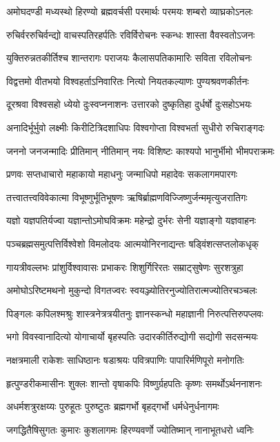 \twolineshloka
{अमोघदण्डी मध्यस्थो हिरण्यो ब्रह्मवर्चसी}
{परमार्थः परमयः शम्बरो व्याघ्रकोऽनलः}

\twolineshloka
{रुचिर्वररुचिर्वन्द्यो वाचस्पतिरहर्पतिः}
{रविर्विरोचनः स्कन्धः शास्ता वैवस्वतोऽजनः}

\twolineshloka
{युक्तिरुन्नतकीर्तिश्च शान्तरागः पराजयः}
{कैलासपतिकामारिः सविता रविलोचनः}

\twolineshloka
{विद्वत्तमो वीतभयो विश्वहर्ताऽनिवारितः}
{नित्यो नियतकल्याणः पुण्यश्रवणकीर्तनः}

\twolineshloka
{दूरश्रवा विश्वसहो ध्येयो दुःस्वप्ननाशनः}
{उत्तारको दुष्कृतिहा दुर्धर्षो दुःसहोऽभयः}

\twolineshloka
{अनादिर्भूर्भुवो लक्ष्मीः किरीटित्रिदशाधिपः}
{विश्वगोप्ता विश्वभर्ता सुधीरो रुचिराङ्गदः}

\twolineshloka
{जननो जनजन्मादिः प्रीतिमान् नीतिमान् नयः}
{विशिष्टः काश्यपो भानुर्भीमो भीमपराक्रमः}

\twolineshloka
{प्रणवः सप्तधाचारो महाकायो महाधनुः}
{जन्माधिपो महादेवः सकलागमपारगः}

\twolineshloka
{तत्त्वातत्त्वविवेकात्मा विभूष्णुर्भूतिभूषणः}
{ऋषिर्ब्राह्मणविज्जिष्णुर्जन्ममृत्युजरातिगः}

\twolineshloka
{यज्ञो यज्ञपतिर्यज्वा यज्ञान्तोऽमोघविक्रमः}
{महेन्द्रो दुर्भरः सेनी यज्ञाङ्गो यज्ञवाहनः}

\twolineshloka
{पञ्चब्रह्मसमुत्पत्तिर्विश्वेशो विमलोदयः}
{आत्मयोनिरनाद्यन्तः षड्विंशत्सप्तलोकधृक्}

\twolineshloka
{गायत्रीवल्लभः प्रांशुर्विश्वावासः प्रभाकरः}
{शिशुर्गिरिरतः सम्राट्सुषेणः सुरशत्रुहा}

\twolineshloka
{अमोघोऽरिष्टमथनो मुकुन्दो विगतज्वरः}
{स्वयञ्ज्योतिरनुज्योतिरात्मज्योतिरचञ्चलः}

\twolineshloka
{पिङ्गलः कपिलश्मश्रुः शास्त्रनेत्रत्रयीतनुः}
{ज्ञानस्कन्धो महाज्ञानी निरुत्पत्तिरुपप्लवः}

\twolineshloka
{भगो विवस्वानादित्यो योगाचार्यो बृहस्पतिः}
{उदारकीर्तिरुद्योगी सद्योगी सदसन्मयः}

\twolineshloka
{नक्षत्रमाली राकेशः साधिष्ठानः षडाश्रयः}
{पवित्रपाणिः पापारिर्मणिपूरो मनोगतिः}

\twolineshloka
{हृत्पुण्डरीकमासीनः शुक्लः शान्तो वृषाकपिः}
{विष्णुर्ग्रहपतिः कृष्णः समर्थोऽर्थननाशनः}

\twolineshloka
{अधर्मशत्रुरक्षय्यः पुरुहूतः पुरुष्टुतः}
{ब्रह्मगर्भो बृहद्गर्भो धर्मधेनुर्धनागमः}

\twolineshloka
{जगद्धितैषिसुगतः कुमारः कुशलागमः}
{हिरण्यवर्णो ज्योतिष्मान् नानाभूतधरो ध्वनिः}

